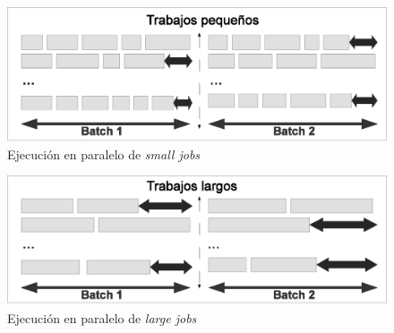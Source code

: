 \begin{figure}[H]
\centering
\includegraphics[scale=.75]{images/small_jobs.eps}
\caption{Ejecución en paralelo de \textit{small jobs}}
\label{fig:small_jobs}
\end{figure}

\begin{figure}[H]
\centering
\includegraphics[scale=.75]{images/large_jobs.eps}
\caption{Ejecución en paralelo de \textit{large jobs}}
\label{fig:large_jobs}
\end{figure}
